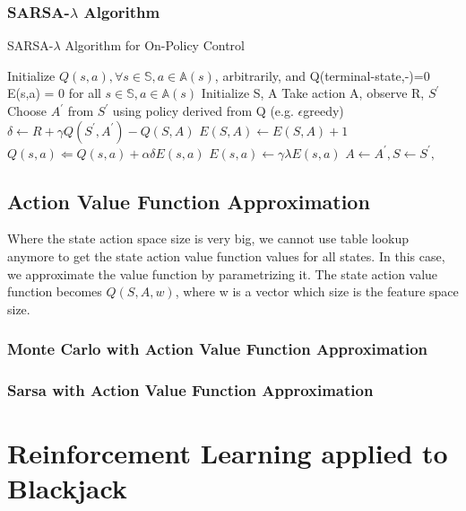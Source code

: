 \documentclass[12pt,a4paper]{article}
\begin{document}
\subsubsection{SARSA-$\lambda$ Algorithm}

\begin{algorithm}
\caption{SARSA-$\lambda$ Algorithm for On-Policy Control}
\label{alg:sarsa_lambda}
\begin{algorithmic}[1]
\State Initialize $Q(s,a),\forall s \in \mathbb{S}, a \in \mathbb{A}(s)$, arbitrarily, and Q(terminal-state,-)=0
\State E(s,a) = 0 for all $s\in\mathbb{S}, a\in\mathbb{A}(s)$
\State Initialize S, A
\State Take action A, observe R, $S^{\prime}$
\State Choose $A^{\prime}$ from $S^{\prime}$ using policy derived from Q (e.g. $\epsilon$greedy)
\State $\delta \leftarrow R + \gamma Q(S^{\prime},A^{\prime}) - Q(S,A) $
\State $E(S,A) \leftarrow E(S,A) + 1$ 
\State $Q(s,a) \Leftarrow Q(s,a) + \alpha\delta E(s,a)$
\State $E(s,a) \leftarrow \gamma \lambda E(s,a)$
\EndFor
\State $A \leftarrow A^{\prime}, S \leftarrow S^{\prime},$
\EndFor
\EndFor
\end{algorithmic}
\end{algorithm}


\subsection{Action Value Function Approximation}
Where the state action space size is very big, we cannot use table lookup anymore to get the state action value function values for all states. In this case, we approximate the value function by parametrizing it.
The state action value function becomes $Q(S, A, w)$, where w is a vector which size is the feature space size.


\subsubsection{Monte Carlo with Action Value Function Approximation}



\subsubsection{Sarsa with Action Value Function Approximation}


\section{Reinforcement Learning applied to Blackjack}
\end{document}
